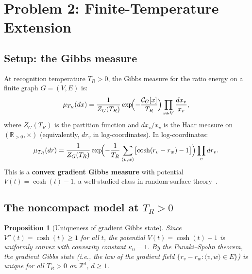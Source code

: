 \documentclass[11pt]{article}
\newtheorem{proposition}{Proposition}
\theoremstyle{definition}
\newcommand{\TR}{{T_R}}
\newcommand{\Ctotal}{\mathcal{C}}
\begin{document}
\section{Problem 2: Finite-Temperature Extension}
\label{sec:prob2}

\subsection{Setup: the Gibbs measure}

At recognition temperature $\TR > 0$, the Gibbs measure for the ratio energy on a finite graph $G = (V, E)$ is:
\begin{equation}
\mu_{\TR}(dx) = \frac{1}{Z_G(\TR)} \exp\!\Bigl(-\frac{\Ctotal_G[x]}{\TR}\Bigr) \prod_{v \in V} \frac{dx_v}{x_v},
\label{eq:gibbs-noncompact}
\end{equation}
where $Z_G(\TR)$ is the partition function and $dx_v/x_v$ is the Haar measure on $(\mathbb{R}_{>0}, \times)$ (equivalently, $dr_v$ in log-coordinates). In log-coordinates:
\begin{equation}
\mu_{\TR}(dr) = \frac{1}{Z_G(\TR)} \exp\!\Bigl(-\frac{1}{\TR}\sum_{\langle v,w\rangle} \bigl[\cosh(r_v - r_w) - 1\bigr]\Bigr) \prod_{v} dr_v.
\label{eq:gibbs-log}
\end{equation}
This is a \textbf{convex gradient Gibbs measure} with potential $V(t) = \cosh(t) - 1$, a well-studied class in random-surface theory~\cite{Funaki,Velenik,NaddafSpencer}.

\subsection{The noncompact model at $\TR > 0$}

\begin{proposition}[Uniqueness of gradient Gibbs state]
\label{prop:unique-gradient}
Since $V''(t) = \cosh(t) \geq 1$ for all $t$, the potential $V(t) = \cosh(t) - 1$ is \emph{uniformly convex} with convexity constant $\kappa_0 = 1$. By the Funaki--Spohn theorem, the gradient Gibbs state (i.e., the law of the gradient field $\{r_v - r_w : \langle v,w\rangle \in E\}$) is unique for all $\TR > 0$ on $\mathbb{Z}^d$, $d \geq 1$.
\end{proposition}
\end{document}
